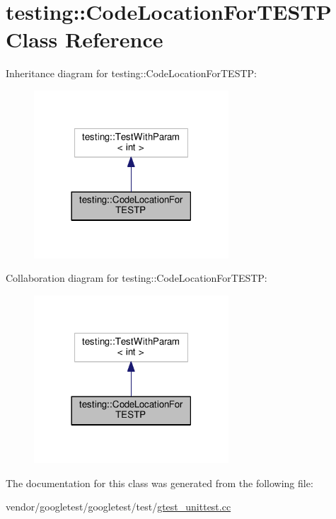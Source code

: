 \hypertarget{classtesting_1_1CodeLocationForTESTP}{}\section{testing\+:\+:Code\+Location\+For\+T\+E\+S\+TP Class Reference}
\label{classtesting_1_1CodeLocationForTESTP}


Inheritance diagram for testing\+:\+:Code\+Location\+For\+T\+E\+S\+TP\+:\nopagebreak
\begin{figure}[H]
\begin{center}
\leavevmode
\includegraphics[width=206pt]{classtesting_1_1CodeLocationForTESTP__inherit__graph}
\end{center}
\end{figure}


Collaboration diagram for testing\+:\+:Code\+Location\+For\+T\+E\+S\+TP\+:\nopagebreak
\begin{figure}[H]
\begin{center}
\leavevmode
\includegraphics[width=206pt]{classtesting_1_1CodeLocationForTESTP__coll__graph}
\end{center}
\end{figure}


The documentation for this class was generated from the following file\+:\begin{DoxyCompactItemize}
\item 
vendor/googletest/googletest/test/\hyperlink{gtest__unittest_8cc}{gtest\+\_\+unittest.\+cc}\end{DoxyCompactItemize}
